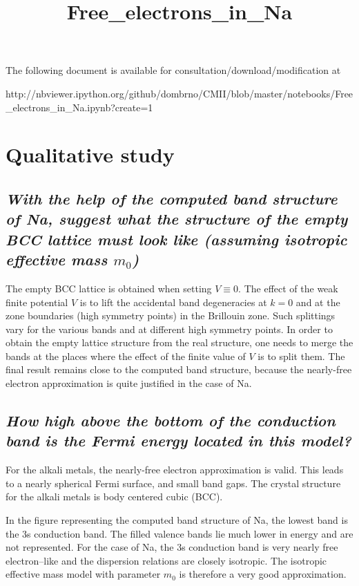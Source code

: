 \documentclass{article}
\title{Free\_electrons\_in\_Na}
\begin{document}
    
    
    \maketitle
    
    

    
    The following document is available for
consultation/download/modification at

http://nbviewer.ipython.org/github/dombrno/CMII/blob/master/notebooks/Free\_electrons\_in\_Na.ipynb?create=1


    \section{Qualitative study}



    \subsection{\emph{With the help of the computed band structure of Na, suggest what
the structure of the empty BCC lattice must look like (assuming
isotropic effective mass $m_0$)}}


    The empty BCC lattice is obtained when setting $V \equiv 0$. The effect
of the weak finite potential $V$ is to lift the accidental band
degeneracies at $k=0$ and at the zone boundaries (high symmetry points)
in the Brillouin zone. Such splittings vary for the various bands and at
different high symmetry points. In order to obtain the empty lattice
structure from the real structure, one needs to merge the bands at the
places where the effect of the finite value of $V$ is to split them. The
final result remains close to the computed band structure, because the
nearly-free electron approximation is quite justified in the case of Na.


    \subsection{\emph{How high above the bottom of the conduction band is the Fermi
energy located in this model?}}


    For the alkali metals, the nearly-free electron approximation is valid.
This leads to a nearly spherical Fermi surface, and small band gaps. The
crystal structure for the alkali metals is body centered cubic (BCC).

In the figure representing the computed band structure of Na, the lowest
band is the 3s conduction band. The filled valence bands lie much lower
in energy and are not represented. For the case of Na, the 3s conduction
band is very nearly free electron--like and the dispersion relations are
closely isotropic. The isotropic effective mass model with parameter
$m_0$ is therefore a very good approximation.
\end{document}
